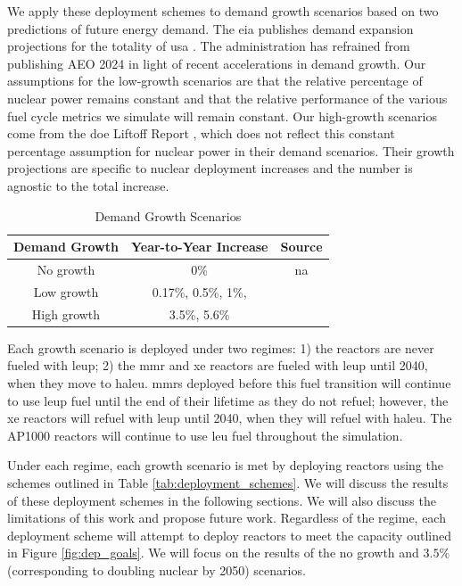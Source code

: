 We apply these deployment schemes to demand growth scenarios based on two
predictions of future energy demand. The \gls{eia} publishes demand expansion
projections for the totality of \gls{usa} \cite{eia_aeo_2023}. The
administration has refrained from publishing AEO 2024 in light of recent
accelerations in demand growth. Our assumptions for the low-growth scenarios
are that the relative percentage of nuclear power remains constant and that the
relative performance of the various fuel cycle metrics we simulate will remain
constant. Our high-growth scenarios come from the \gls{doe} Liftoff Report
\cite{julie_liftoff_pathways_2024}, which does not reflect this constant
percentage assumption for nuclear power in their demand scenarios. Their growth
projections are specific to nuclear deployment increases and the number is
agnostic to the total increase.

\begin{table}[H]
    \centering
    \caption{Demand Growth Scenarios}
    \label{tab:demand_scenarios}
    \begin{tabular}{c c c}
        \hline
        \textbf{Demand Growth} & \textbf{Year-to-Year Increase} & \textbf{Source}\\
        \hline
        No growth & 0\% & na\\
        Low growth & 0.17\%, 0.5\%, 1\%, & \cite{eia_aeo_2023}\\
        High growth & 3.5\%, 5.6\% & \cite{julie_liftoff_pathways_2024}\\
        \hline
    \end{tabular}
\end{table}

Each growth scenario is deployed under two regimes: 1) the reactors are never
fueled with \gls{leup}; 2) the \gls{mmr} and \gls{xe} reactors are fueled with
\gls{leup} until 2040, when they move to \gls{haleu}. \glspl{mmr} deployed
before this fuel transition will continue to use \gls{leup} fuel until the end
of their lifetime as they do not refuel; however, the \gls{xe} reactors will
refuel with \gls{leup} until 2040, when they will refuel with \gls{haleu}. The
AP1000 reactors will continue to use \gls{leu} fuel throughout the simulation.

Under each regime, each growth scenario is met by deploying reactors using the
schemes outlined in Table \ref{tab:deployment_schemes}. We will discuss the
results of these deployment schemes in the following sections. We will also
discuss the limitations of this work and propose future work. Regardless of the
regime, each deployment scheme will attempt to deploy reactors to meet the
capacity outlined in Figure \ref{fig:dep_goals}. We will focus on the results
of the no growth and $3.5\%$ (corresponding to doubling nuclear by 2050)
scenarios.

